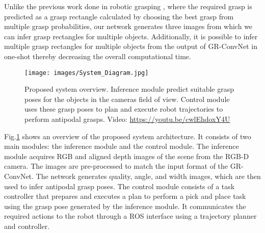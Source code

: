 \documentclass[letterpaper, 10pt, conference]{IEEEtran}
\begin{document}
Unlike the previous work done in robotic grasping \cite{lenz2015deep,redmon2015real,pinto2016supersizing,kumra2017robotic}, where the required grasp is predicted as a grasp rectangle calculated by choosing the best grasp from multiple grasp probabilities, our network generates three images from which we can infer grasp rectangles for multiple objects. Additionally, it is possible to infer multiple grasp rectangles for multiple objects from the output of GR-ConvNet in one-shot thereby decreasing the overall computational time.

\begin{figure}
    \centering
    \texttt{[image: images/System\_Diagram.jpg]}
    \caption{Proposed system overview. Inference module predict suitable grasp poses for the objects in the camera\textquotesingle s field of view. Control module uses these grasp poses to plan and execute robot trajectories to perform antipodal grasps. Video: \href{https://youtu.be/cwlEhdoxY4U}{https://youtu.be/cwlEhdoxY4U}}
    \label{fig: architecture}
\end{figure}

Fig.\ref{fig: architecture} shows an overview of the proposed system architecture. It consists of two main modules: the inference module and the control module. The inference module acquires RGB and aligned depth images of the scene from the RGB-D camera. The images are pre-processed to match the input format of the GR-ConvNet. The network generates quality, angle, and width images, which are then used to infer antipodal grasp poses. The control module consists of a task controller that prepares and executes a plan to perform a pick and place task using the grasp pose generated by the inference module. It communicates the required actions to the robot through a ROS interface using a trajectory planner and controller.
\end{document}
